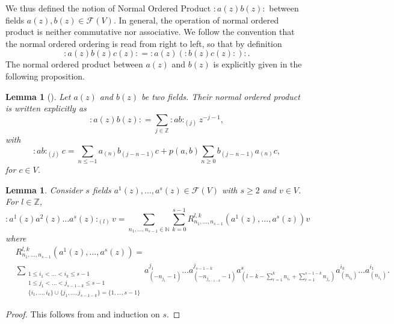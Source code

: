 \documentclass[a4paper, 12pt, reqno]{amsart}
\newtheorem{lemma}[theorem]{Lemma}
\theoremstyle{remark}
\numberwithin{equation}{subsection}
\begin{document}
We thus defined the notion of Normal Ordered Product $:a(z)b(z):$ between fields $a(z), b(z) \in \mathcal{F}(V)$.
In general, the operation of normal ordered product is neither commutative nor associative. We follow the convention that the normal ordered ordering is read from right to left, so that by definition
\begin{equation*}
  :a(z)b(z)c(z): = :a(z)(:b(z)c(z):):.
\end{equation*}
The normal ordered product between $a(z)$ and $b(z)$ is explicitly given in the following proposition.

\begin{lemma}[{\cite[Proposition 3.3.3]{nozaradan_introduction_2008}}]
  \label{lmm:2}
  Let $a(z)$ and $b(z)$ be two fields. Their normal ordered product is written explicitly as
  \begin{equation*}
    :a(z)b(z): = \sum_{j \in \mathbb{Z}}:ab:_{(j)}z^{-j - 1},
  \end{equation*}
  with
  \begin{equation*}
    :ab:_{(j)}c = \sum_{n \le -1}a_{(n)}b_{(j - n - 1)}c + p(a, b)\sum_{n \ge 0}b_{(j - n - 1)}a_{(n)}c,
  \end{equation*}
  for $c \in V$.
\end{lemma}

\begin{lemma}
  \label{lmm:3}
  Consider $s$ fields $a^1(z), \dots, a^s(z) \in \mathcal{F}(V)$ with $s \ge 2$ and $v \in V$.
  For $l \in \mathbb{Z}$,
  \begin{equation*}
    :a^1(z)a^2(z)\dots a^s(z):_{(l)}v = \sum_{n_1, \dots, n_{s - 1} \in \mathbb{N}}\sum_{k = 0}^{s - 1}R^{l, k}_{n_1, \dots, n_{s - 1}}(a^1(z), \dots, a^s(z))v
  \end{equation*}
  where
  \begin{align*}
    &R^{l, k}_{n_1, \dots, n_{s - 1}}(a^1(z), \dots, a^s(z)) =\\
    &\sum_{\substack{1 \le i_1 < \dots < i_k \le s - 1 \\ 1 \le j_1 < \dots < j_{s - 1 - k} \le s - 1 \\ \{i_1, \dots, i_k\} \cup \{j_1, \dots, j_{s - 1 - k}\} = \{1, \dots, s - 1\}}}a^{j_1}_{(-n_{j_1} - 1)}\dots a^{j_{s - 1 - k}}_{(-n_{j_{s - 1 - k}} - 1)}a^s_{(l - k - \sum_{r = 1}^k n_{i_r} + \sum_{r = 1}^{s - 1 - k}n_{j_r})}a^{i_k}_{(n_{i_k})}\dots a^{i_1}_{(n_{i_1})}.
  \end{align*}
\end{lemma}

\begin{proof}
  This follows from  and induction on $s$.
\end{proof}
\end{document}
